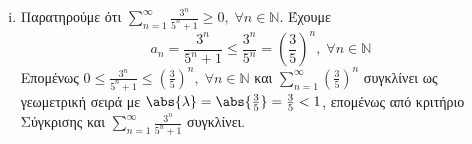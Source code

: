 \begin{enumerate}
\begin{enumerate}[i)]
        \item Παρατηρούμε ότι $ \sum_{n=1}^{\infty} \frac{3^{n}}{5^{n}+1} \geq 0, 
            \; \forall n \in \mathbb{N}$. Έχουμε
            \[
                a_{n} = \frac{3^{n}}{5^{n}+1} \leq \frac{3^{n}}{5^{n}} = 
                \left(\frac{3}{5}\right)^{n}, \; \forall n \in \mathbb{N} 
            \] 
            Επομένως $ 0 \leq \frac{3^{n}}{5^{n}+1} \leq \left(\frac{3}{5} \right)^{n},
            \; \forall n \in \mathbb{N} $ και $ \sum_{n=1}^{\infty} 
            \left(\frac{3}{5} \right)^{n}$
            συγκλίνει ως γεωμετρική σειρά με $ \abs{\lambda} = \abs{\frac{3}{5}} = 
            \frac{3}{5} < 1 $, επομένως από κριτήριο Σύγκρισης και 
            $ \sum_{n=1}^{\infty} \frac{3^{n}}{5^{n}+1} $ συγκλίνει.
    \end{enumerate}
\end{enumerate}




